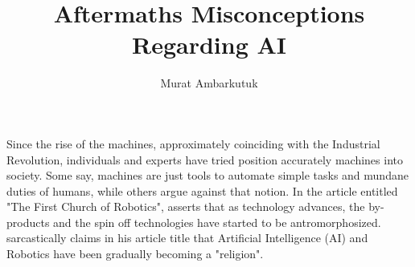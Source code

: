 \documentclass[man]{apa6}
\title{Aftermaths Misconceptions Regarding AI}
\author{Murat Ambarkutuk}
\affiliation{English Language Institute, University of Delaware \\ murata@udel.edu}
\begin{document}
\maketitle
Since the rise of the machines, approximately coinciding with the Industrial Revolution, individuals and experts have tried position accurately machines into society. Some say, machines are just tools to automate simple tasks and mundane duties of humans, while others argue against that notion. In the article entitled "The First Church of Robotics",  asserts that as technology advances, the by-products and the spin off technologies have started to be antromorphosized.  sarcastically claims in his article title that Artificial Intelligence (AI)  and Robotics have been gradually becoming a "religion".\par



\end{document}

